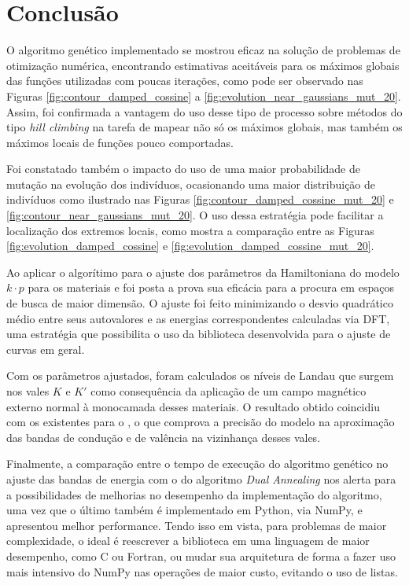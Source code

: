 \chapter{Conclusão}
\label{cap_conclusao}

O algoritmo genético implementado se mostrou eficaz na solução de problemas de
otimização numérica, encontrando estimativas aceitáveis para os máximos globais
das funções utilizadas com poucas iterações, como pode ser observado nas Figuras
\ref{fig:contour_damped_cossine} a \ref{fig:evolution_near_gaussians_mut_20}. Assim, foi
confirmada a vantagem do uso desse tipo de processo sobre métodos do tipo
\textit{hill climbing} na tarefa de mapear não só os máximos globais, mas também
os máximos locais de funções pouco comportadas.

Foi constatado também o impacto do uso de uma maior probabilidade de mutação na
evolução dos indivíduos, ocasionando uma maior distribuição de indivíduos como
ilustrado nas Figuras \ref{fig:contour_damped_cossine_mut_20} e
\ref{fig:contour_near_gaussians_mut_20}. O uso dessa estratégia pode facilitar a
localização dos extremos locais, como mostra a comparação entre as Figuras
\ref{fig:evolution_damped_cossine} e \ref{fig:evolution_damped_cossine_mut_20}.

Ao aplicar o algorítimo para o ajuste dos parâmetros da Hamiltoniana do modelo 
$ k \cdot p $ para os materiais  e  foi posta a prova sua
eficácia para a procura em espaços de busca de maior dimensão. O ajuste foi
feito minimizando o desvio quadrático médio entre seus autovalores e as energias
correspondentes calculadas via DFT, uma estratégia que possibilita o uso da
biblioteca desenvolvida para o ajuste de curvas em geral.

Com os parâmetros ajustados, foram calculados os níveis de Landau que surgem nos
vales $K$ e $K'$ como consequência da aplicação de um campo magnético externo
normal à monocamada desses materiais. O resultado obtido coincidiu com os
existentes para o  \cite{dias2016tmdc}, o que comprova a precisão do
modelo na aproximação das bandas de condução e de valência na vizinhança desses
vales.

Finalmente, a comparação entre o tempo de execução do algoritmo genético no
ajuste das bandas de energia com o do algoritmo \textit{Dual Annealing} nos
alerta para a possibilidades de melhorias no desempenho da implementação do
algoritmo, uma vez que o último também é implementado em Python, via NumPy, e
apresentou melhor performance. Tendo isso em vista, para problemas de maior
complexidade, o ideal é reescrever a biblioteca em uma linguagem de maior
desempenho, como C ou Fortran, ou mudar sua arquitetura de forma a fazer uso
mais intensivo do NumPy nas operações de maior custo, evitando o uso de listas.

\nocite{ribeiro2013ga}